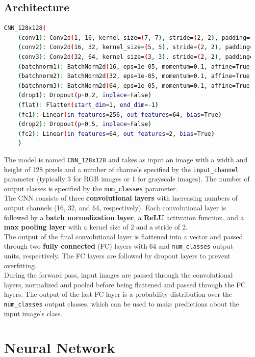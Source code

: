 \documentclass{report}
\begin{document}
\subsection{Architecture}
\begin{lstlisting}[language=bash]
CNN_128x128(
    (conv1): Conv2d(1, 16, kernel_size=(7, 7), stride=(2, 2), padding=(1, 1))
    (conv2): Conv2d(16, 32, kernel_size=(5, 5), stride=(2, 2), padding=(1, 1))
    (conv3): Conv2d(32, 64, kernel_size=(3, 3), stride=(2, 2), padding=(1, 1))
    (batchnorm1): BatchNorm2d(16, eps=1e-05, momentum=0.1, affine=True, track_running_stats=True)
    (batchnorm2): BatchNorm2d(32, eps=1e-05, momentum=0.1, affine=True, track_running_stats=True)
    (batchnorm3): BatchNorm2d(64, eps=1e-05, momentum=0.1, affine=True, track_running_stats=True)
    (drop1): Dropout(p=0.2, inplace=False)
    (flat): Flatten(start_dim=1, end_dim=-1)
    (fc1): Linear(in_features=256, out_features=64, bias=True)
    (drop2): Dropout(p=0.5, inplace=False)
    (fc2): Linear(in_features=64, out_features=2, bias=True)
    )
\end{lstlisting}
The model is named \texttt{CNN\_128x128} and takes as input an image with a width and height of 128 pixels and a number of channels specified by the \texttt{input\_channel} parameter
(typically 3 for RGB images or 1 for grayscale images). The number of output classes is specified by the \texttt{num\_classes} parameter.\\
The CNN consists of three \textbf{convolutional layers} with increasing numbers of output channels (16, 32, and 64, respectively). Each convolutional layer is followed by a \textbf{batch normalization layer},
a \textbf{ReLU} activation function, and a \textbf{max pooling layer} with a kernel size of 2 and a stride of 2. \\
The output of the final convolutional layer is flattened into a vector and passed through two \textbf{fully connected} (FC) layers with 64 and \texttt{num\_classes} output units, respectively.
The FC layers are followed by dropout layers to prevent overfitting.\\

During the forward pass, input images are passed through the convolutional layers, normalized and pooled before being flattened and passed through the FC layers.
The output of the last FC layer is a probability distribution over the \texttt{num\_classes} output classes, which can be used to make predictions about the input image's class.


\section{Neural Network}
\end{document}
